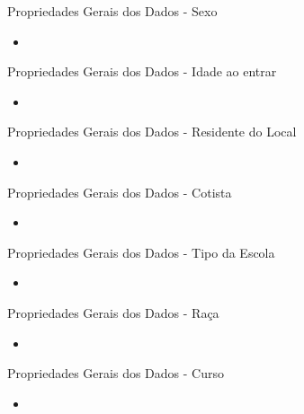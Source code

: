 \begin{frame}{Propriedades Gerais dos Dados - Sexo}
    \begin{itemize}[itemsep=3ex]
            \item <gráfico de barra mostrando porcentagem de meninos e meninas>
    \end{itemize}
\end{frame}

\begin{frame}{Propriedades Gerais dos Dados - Idade ao entrar}
    \begin{itemize}[itemsep=3ex]
            \item <gráfico de barra mostrando as idades>
    \end{itemize}
\end{frame}

\begin{frame}{Propriedades Gerais dos Dados - Residente do Local}
    \begin{itemize}[itemsep=3ex]
            \item <gráfico de barra mostrando se é local ou não - com missing values>
    \end{itemize}
\end{frame}

\begin{frame}{Propriedades Gerais dos Dados - Cotista}
    \begin{itemize}[itemsep=3ex]
            \item <gráfico de barra >
    \end{itemize}
\end{frame}

\begin{frame}{Propriedades Gerais dos Dados - Tipo da Escola}
    \begin{itemize}[itemsep=3ex]
            \item <gráfico de barra >
    \end{itemize}
\end{frame}

\begin{frame}{Propriedades Gerais dos Dados - Raça}
    \begin{itemize}[itemsep=3ex]
            \item <gráfico de barra >
    \end{itemize}
\end{frame}

\begin{frame}{Propriedades Gerais dos Dados - Curso}
    \begin{itemize}[itemsep=3ex]
            \item <gráfico de barra >
    \end{itemize}
\end{frame}

